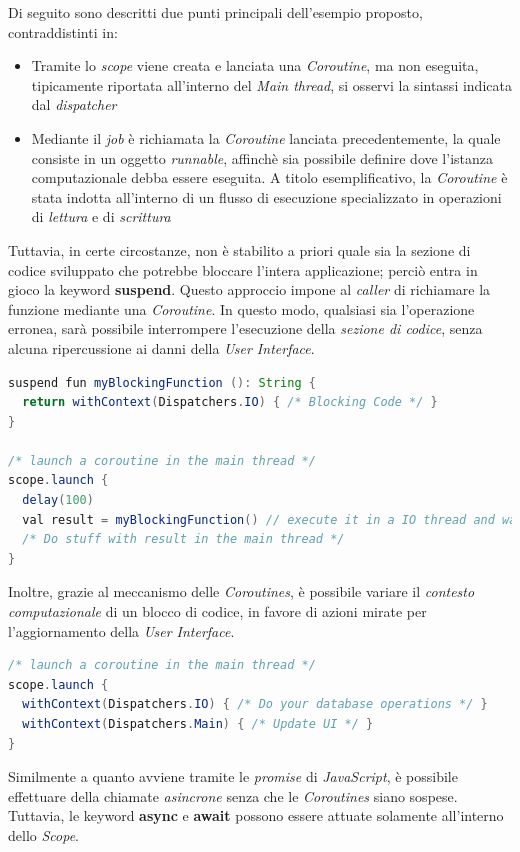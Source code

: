 \documentclass{article}
\begin{document}
Di seguito sono descritti due punti principali dell'esempio proposto, contraddistinti in:
\begin{itemize}[label={-}]
  \itemsep0em
  \item Tramite lo \textit{scope} viene creata e lanciata una \textit{Coroutine}, ma non eseguita, tipicamente riportata all'interno del \textit{Main thread}, si osservi la sintassi indicata dal \textit{dispatcher}
  \item Mediante il \textit{job} è richiamata la \textit{Coroutine} lanciata precedentemente, la quale consiste in un oggetto \textit{runnable}, affinchè sia possibile definire dove l'istanza computazionale debba essere eseguita. A titolo esemplificativo, la \textit{Coroutine} è stata indotta all'interno di un flusso di esecuzione specializzato in operazioni di \textit{lettura} e di \textit{scrittura} 
\end{itemize}
Tuttavia, in certe circostanze, non è stabilito a priori quale sia la sezione di codice sviluppato che potrebbe bloccare l'intera applicazione; perciò entra in gioco la keyword \textbf{suspend}.
Questo approccio impone al \textit{caller} di richiamare la funzione mediante una \textit{Coroutine}. In questo modo, qualsiasi sia l'operazione erronea, sarà possibile interrompere l'esecuzione della \textit{sezione di codice}, senza alcuna ripercussione ai danni della \textit{User Interface}.
\begin{lstlisting}[language=JAVA]
suspend fun myBlockingFunction (): String {
  return withContext(Dispatchers.IO) { /* Blocking Code */ }
}

/* launch a coroutine in the main thread */
scope.launch {
  delay(100)
  val result = myBlockingFunction() // execute it in a IO thread and wait here until it finishes
  /* Do stuff with result in the main thread */
}
\end{lstlisting}
Inoltre, grazie al meccanismo delle \textit{Coroutines}, è possibile variare il \textit{contesto computazionale} di un blocco di codice, in favore di azioni mirate per l'aggiornamento della \textit{User Interface}.
\begin{lstlisting}[language=JAVA]
/* launch a coroutine in the main thread */
scope.launch {
  withContext(Dispatchers.IO) { /* Do your database operations */ }
  withContext(Dispatchers.Main) { /* Update UI */ }
}
\end{lstlisting}
Similmente a quanto avviene tramite le \textit{promise} di \textit{JavaScript}, è possibile effettuare della chiamate \textit{asincrone} senza che le \textit{Coroutines} siano sospese. Tuttavia, le keyword \textbf{async} e \textbf{await} possono essere attuate solamente all'interno dello \textit{Scope}.
\end{document}
